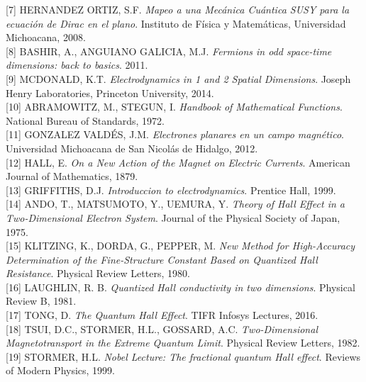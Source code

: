 \documentclass[11pt,letterpaper]{article}     %
\begin{document}
[7] HERNANDEZ ORTIZ, S.F. \emph{Mapeo a una Mecánica Cuántica SUSY para la
ecuación de Dirac en el plano}. Instituto de Física y Matemáticas, Universidad Michoacana, 2008. \\

[8] BASHIR, A., ANGUIANO GALICIA, M.J. \emph{Fermions in odd space-time dimensions:
back to basics}. 2011. \\

[9] MCDONALD, K.T. \emph{Electrodynamics in 1 and 2 Spatial Dimensions}. Joseph Henry Laboratories, Princeton University, 2014. \\

[10] ABRAMOWITZ, M., STEGUN, I. \emph{Handbook of Mathematical Functions}. National Bureau of Standards, 1972. \\

[11] GONZALEZ VALDÉS, J.M. \emph{Electrones planares en un campo magnético}. Universidad Michoacana de San Nicolás de Hidalgo, 2012. \\

[12] HALL, E. \emph{On a New Action of the Magnet on Electric Currents}. American Journal of Mathematics, 1879. \\

[13] GRIFFITHS, D.J. \emph{Introduccion to electrodynamics}. Prentice Hall, 1999. \\

[14] ANDO, T., MATSUMOTO, Y., UEMURA, Y. \emph{Theory of Hall Effect in a Two-Dimensional Electron System}. Journal of the Physical Society of Japan, 1975. \\

[15] KLITZING, K., DORDA, G., PEPPER, M. \emph{New Method for High-Accuracy Determination of the Fine-Structure Constant Based on Quantized Hall Resistance}. Physical Review Letters, 1980. \\

[16] LAUGHLIN, R. B. \emph{Quantized Hall conductivity in two dimensions}. Physical Review B, 1981. \\

[17] TONG, D. \emph{The Quantum Hall Effect}. TIFR Infosys Lectures, 2016. \\

[18] TSUI, D.C., STORMER, H.L., GOSSARD, A.C. \emph{Two-Dimensional Magnetotransport in the Extreme Quantum Limit}. Physical Review Letters, 1982. \\

[19] STORMER, H.L. \emph{Nobel Lecture: The fractional quantum Hall effect}. Reviews of Modern Physics, 1999. \\
\end{document}
